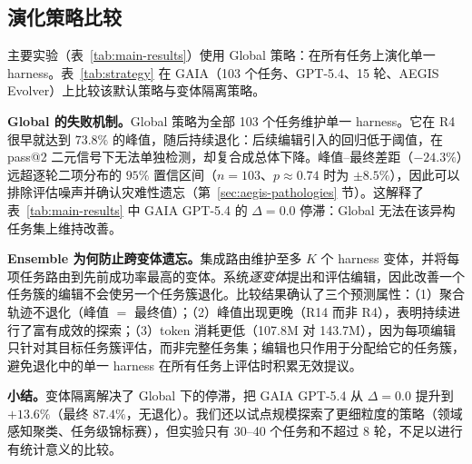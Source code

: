 \subsection{演化策略比较}
\label{sec:exp-strategy}

主要实验（表~\ref{tab:main-results}）使用 Global 策略：在所有任务上演化单一 harness。表~\ref{tab:strategy} 在 GAIA（103 个任务、GPT-5.4、15 轮、AEGIS Evolver）上比较该默认策略与变体隔离策略。

\begin{table}[!htbp]
\centering
\small
\caption{演化策略比较（GAIA、GPT-5.4、AEGIS Evolver、15 轮）。最终值减峰值表示稳定性；负值意味着灾难性遗忘。}
\label{tab:strategy}
\end{table}

\textbf{Global 的失败机制。}Global 策略为全部 103 个任务维护单一 harness。它在 R4 很早就达到 $73.8\%$ 的峰值，随后持续退化：后续编辑引入的回归低于阈值，在 pass@2 二元信号下无法单独检测，却复合成总体下降。峰值--最终差距（$-24.3\%$）远超逐轮二项分布的 $95\%$ 置信区间（$n{=}103$、$p{\approx}0.74$ 时为 $\pm8.5\%$），因此可以排除评估噪声并确认灾难性遗忘（第~\ref{sec:aegis-pathologies} 节）。这解释了表~\ref{tab:main-results} 中 GAIA GPT-5.4 的 $\Delta{=}0.0$ 停滞：Global 无法在该异构任务集上维持改善。

\textbf{Ensemble 为何防止跨变体遗忘。}集成路由维护至多 $K$ 个 harness 变体，并将每项任务路由到先前成功率最高的变体。系统\textit{逐变体}提出和评估编辑，因此改善一个任务簇的编辑不会使另一个任务簇退化。比较结果确认了三个预测属性：（1）聚合轨迹不退化（峰值 $=$ 最终值）；（2）峰值出现更晚（R14 而非 R4），表明持续进行了富有成效的探索；（3）token 消耗更低（107.8M 对 143.7M），因为每项编辑只针对其目标任务簇评估，而非完整任务集；编辑也只作用于分配给它的任务簇，避免退化中的单一 harness 在所有任务上评估时积累无效提议。

\textbf{小结。}变体隔离解决了 Global 下的停滞，把 GAIA GPT-5.4 从 $\Delta{=}0.0$ 提升到 $+13.6\%$（最终 $87.4\%$，无退化）。我们还以试点规模探索了更细粒度的策略（领域感知聚类、任务级锦标赛），但实验只有 30--40 个任务和不超过 8 轮，不足以进行有统计意义的比较。

